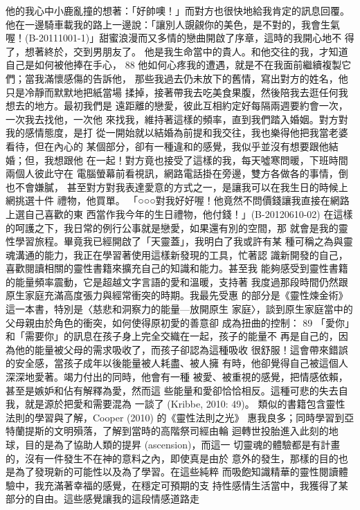 他的我心中小鹿亂撞的想著：「好帥噢！」而對方也很快地給我肯定的訊息回覆。
他在一邊騎車載我的路上一邊說：「讓別人覬覦你的美色，是不對的，我會生氣
喔！(B-20111001-1)」甜蜜浪漫而又多情的戀曲開啟了序章，這時的我開心地不
得了，想著終於，交到男朋友了。 
他是我生命當中的貴人。和他交往的我，才知道自己是如何被他捧在手心，
88 
他如何心疼我的遭遇，就是不在我面前繼續複製它們；當我滿懷感傷的告訴他，
那些我過去仍未放下的舊情，寫出對方的姓名，他只是冷靜而默默地把紙當場
揉掉，接著帶我去吃美食果腹，然後陪我去逛任何我想去的地方。最初我們是
遠距離的戀愛，彼此互相約定好每隔兩週要約會一次，一次我去找他，一次他
來找我，維持著這樣的頻率，直到我們踏入婚姻。對方對我的感情態度，是打
從一開始就以結婚為前提和我交往，我也樂得他把我當老婆看待，但在內心的
某個部分，卻有一種違和的感覺，我似乎並沒有想要跟他結婚；但，我想跟他
在一起！對方竟也接受了這樣的我，每天噓寒問暖，下班時間兩個人彼此守在
電腦螢幕前看視訊，網路電話掛在旁邊，雙方各做各的事情，倒也不會嫌膩，
甚至對方對我表達愛意的方式之一，是讓我可以在我生日的時候上網挑選十件
禮物，他買單。 
「○○○對我好好喔！他竟然不問價錢讓我直接在網路上選自己喜歡的東
西當作我今年的生日禮物，他付錢！」(B-20120610-02) 
在這樣的呵護之下，我日常的例行公事就是戀愛，如果還有別的空間，那
就會是我的靈性學習旅程。畢竟我已經開啟了「天靈蓋」，我明白了我或許有某
種可稱之為與靈魂溝通的能力，我正在學習著使用這樣新發現的工具，忙著認
識新開發的自己，喜歡閱讀相關的靈性書籍來擴充自己的知識和能力。甚至我
能夠感受到靈性書籍的能量頻率震動，它是超越文字言語的愛和溫暖，支持著
我度過那段時間仍然跟原生家庭充滿高度張力與經常衝突的時期。我最先受惠
的部分是《靈性煉金術》這一本書，特別是〈慈悲和洞察力的能量—放開原生
家庭〉，談到原生家庭當中的父母親由於角色的衝突，如何使得原初愛的善意卻
成為扭曲的控制： 
89 
「愛你」和「需要你」的訊息在孩子身上完全交織在一起，孩子的能量不
再是自己的，因為他的能量被父母的需求吸收了，而孩子卻認為這種吸收
很舒服！這會帶來錯誤的安全感，當孩子成年以後能量被人耗盡、被人擁
有時，他卻覺得自己被這個人深深地愛著。竭力付出的同時，他會有一種
被愛、被重視的感覺，把情感依賴，甚至是嫉妒和佔有解釋為愛，然而這
些能量和愛卻恰恰相反。這種可悲的失去自我，就是源於把愛和需要混為
一談了 (Kribbe, 2010: 49)。 
類似的書籍包含靈性法則的學習與了解，Cooper (2010) 的《靈性法則之光》
惠我良多；同時學習到亞特蘭提斯的文明殞落，了解到當時的高階祭司經由輪
迴轉世投胎進入此刻的地球，目的是為了協助人類的提昇 (ascension)，而這一
切靈魂的體驗都是有計畫的，沒有一件發生不在神的意料之內，即使真是由於
意外的發生，那樣的目的也是為了發現新的可能性以及為了學習。在這些純粹
而吸飽知識精華的靈性閱讀體驗中，我充滿著幸福的感覺，在穩定可預期的支
持性感情生活當中，我獲得了某部分的自由。這些感覺讓我的這段情感道路走
